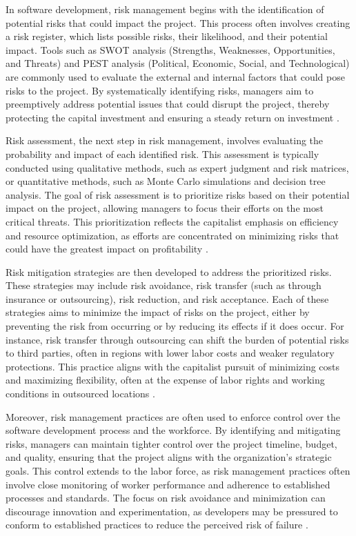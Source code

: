 \begin{refsection}
In software development, risk management begins with the identification of potential risks that could impact the project. This process often involves creating a risk register, which lists possible risks, their likelihood, and their potential impact. Tools such as SWOT analysis (Strengths, Weaknesses, Opportunities, and Threats) and PEST analysis (Political, Economic, Social, and Technological) are commonly used to evaluate the external and internal factors that could pose risks to the project. By systematically identifying risks, managers aim to preemptively address potential issues that could disrupt the project, thereby protecting the capital investment and ensuring a steady return on investment \cite[pp.~102-104]{Kerzner2017ProjectManagement}.

Risk assessment, the next step in risk management, involves evaluating the probability and impact of each identified risk. This assessment is typically conducted using qualitative methods, such as expert judgment and risk matrices, or quantitative methods, such as Monte Carlo simulations and decision tree analysis. The goal of risk assessment is to prioritize risks based on their potential impact on the project, allowing managers to focus their efforts on the most critical threats. This prioritization reflects the capitalist emphasis on efficiency and resource optimization, as efforts are concentrated on minimizing risks that could have the greatest impact on profitability \cite[pp.~55-57]{Hillson2017PracticalProjectRiskManagement}.

Risk mitigation strategies are then developed to address the prioritized risks. These strategies may include risk avoidance, risk transfer (such as through insurance or outsourcing), risk reduction, and risk acceptance. Each of these strategies aims to minimize the impact of risks on the project, either by preventing the risk from occurring or by reducing its effects if it does occur. For instance, risk transfer through outsourcing can shift the burden of potential risks to third parties, often in regions with lower labor costs and weaker regulatory protections. This practice aligns with the capitalist pursuit of minimizing costs and maximizing flexibility, often at the expense of labor rights and working conditions in outsourced locations \cite[pp.~89-91]{Jorion2007ValueAtRisk}.

Moreover, risk management practices are often used to enforce control over the software development process and the workforce. By identifying and mitigating risks, managers can maintain tighter control over the project timeline, budget, and quality, ensuring that the project aligns with the organization’s strategic goals. This control extends to the labor force, as risk management practices often involve close monitoring of worker performance and adherence to established processes and standards. The focus on risk avoidance and minimization can discourage innovation and experimentation, as developers may be pressured to conform to established practices to reduce the perceived risk of failure \cite[pp.~67-69]{DeMarco2003WaltzingWithBears}.


\end{refsection}
